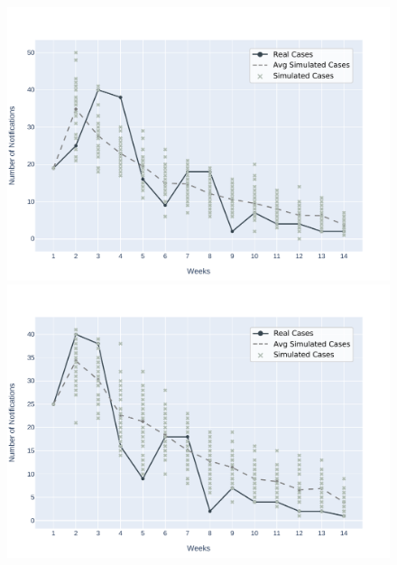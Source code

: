 \begin{figure}[!ht]
    \begin{minipage}[c]{.45\textwidth}
      \centering
      \includegraphics[scale=0.4]{images/experiments-as/AS-2017-01-08.pdf}
    \end{minipage}
    \hspace{0.5cm}
    \begin{minipage}[c]{.45\textwidth}
        \centering
        \includegraphics[scale=0.4]{images/experiments-as/AS-2017-01-15.pdf}
    \end{minipage}
    \\
    \begin{minipage}[c]{.45\textwidth}
        \centering

\end{minipage}
\end{figure}
